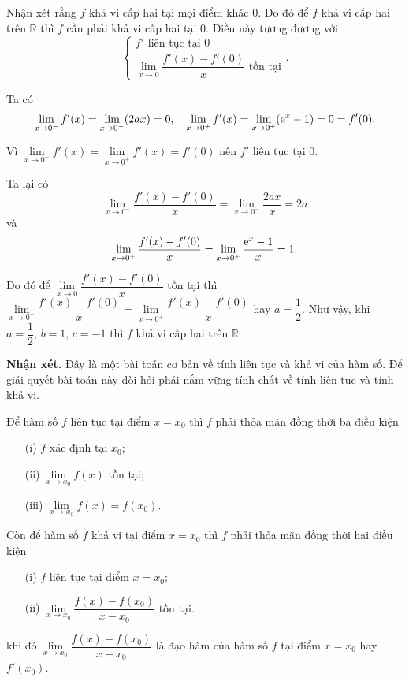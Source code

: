 \begin{enumerate}
{    Nhận xét rằng $f$ khả vi cấp hai tại mọi điểm khác 0. Do đó để $f$ khả vi cấp hai trên $\mathbb{R}$ thì $f$ cần phải khả vi cấp hai tại 0. Điều này tương đương với $$\begin{cases}
        \text{$f'$ liên tục tại 0} \\
        \text{$\lim\limits_{x \to 0}\dfrac{f'(x) - f'(0)}{x}$ tồn tại}
    \end{cases}.$$
    
    Ta có $$\lim\limits_{x \to 0^-}f'(x) = \lim\limits_{x \to 0^-} (2ax) = 0,\quad \lim\limits_{x \to 0^+}f'(x) = \lim\limits_{x \to 0^+} ({\rm e}^x -1) = 0 = f'(0).$$
    
    Vì $\lim\limits_{x \to 0^-}f'(x) = \lim\limits_{x \to 0^+}f'(x) = f'(0)$ nên $f'$ liên tục tại 0.
    
    Ta lại có $$\lim\limits_{x \to 0^-}\dfrac{f'(x)-f'(0)}{x} = \lim\limits_{x \to 0^-}\dfrac{2ax}{x} = 2a$$ và $$\lim\limits_{x \to 0^+}\dfrac{f'(x)-f'(0)}{x} = \lim\limits_{x \to 0^+}\dfrac{{\rm e}^x - 1}{x} = 1.$$
    
    Do đó để $\lim\limits_{x \to 0}\dfrac{f'(x) - f'(0)}{x}$ tồn tại thì $\lim\limits_{x \to 0^-}\dfrac{f'(x) - f'(0)}{x} = \lim\limits_{x \to 0^+}\dfrac{f'(x) - f'(0)}{x}$ hay $a = \dfrac{1}{2}$. Như vậy, khi $a = \dfrac{1}{2},\,b = 1,\,c = -1$ thì $f$ khả vi cấp hai trên $\mathbb{R}$.}
\end{enumerate}

\textbf{Nhận xét. }Đây là một bài toán cơ bản về tính liên tục và khả vi của hàm số. Để giải quyết bài toán này đòi hỏi phải nắm vững tính chất về tính liên tục và tính khả vi.

Để hàm số $f$ liên tục tại điểm $x = x_0$ thì $f$ phải thỏa mãn đồng thời ba điều kiện 
\begin{enumerate}
    \item[(i)] {$f$ xác định tại $x_0$;}
    \item[(ii)] {$\lim\limits_{x\to x_0}f(x)$ tồn tại;}
    \item[(iii)] {$\lim\limits_{x\to x_0}f(x) = f(x_0)$.}
\end{enumerate}

Còn để hàm số $f$ khả vi tại điểm $x = x_0$ thì $f$ phải thỏa mãn đồng thời hai điều kiện 
\begin{enumerate}
    \item[(i)] {$f$ liên tục tại điểm $x = x_0$;}
    \item[(ii)] {$\lim\limits_{x\to x_0}\dfrac{f(x) - f(x_0)}{x - x_0}$ tồn tại.}
\end{enumerate}
khi đó $\lim\limits_{x\to x_0}\dfrac{f(x) - f(x_0)}{x - x_0}$ là đạo hàm của hàm số $f$ tại điểm $x = x_0$ hay $f'(x_0)$.


